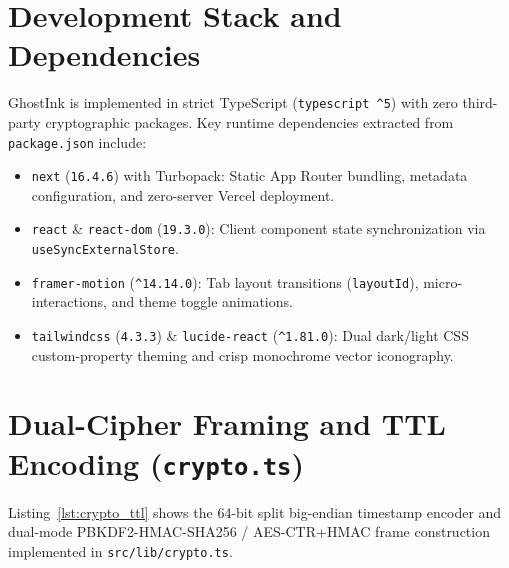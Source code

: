 \documentclass[12pt,a4paper,oneside,openany]{report}
\begin{document}
\section{Development Stack and Dependencies}
GhostInk is implemented in strict TypeScript (\texttt{typescript \^{}5}) with zero third-party cryptographic packages. Key runtime dependencies extracted from \texttt{package.json} include:
\begin{itemize}
    \item \texttt{next} (\texttt{16.4.6}) with Turbopack: Static App Router bundling, metadata configuration, and zero-server Vercel deployment.
    \item \texttt{react} \& \texttt{react-dom} (\texttt{19.3.0}): Client component state synchronization via \texttt{useSyncExternalStore}.
    \item \texttt{framer-motion} (\texttt{\^{}14.14.0}): Tab layout transitions (\texttt{layoutId}), micro-interactions, and theme toggle animations.
    \item \texttt{tailwindcss} (\texttt{4.3.3}) \& \texttt{lucide-react} (\texttt{\^{}1.81.0}): Dual dark/light CSS custom-property theming and crisp monochrome vector iconography.
\end{itemize}

\section{Dual-Cipher Framing and TTL Encoding (\texttt{crypto.ts})}
Listing~\ref{lst:crypto_ttl} shows the 64-bit split big-endian timestamp encoder and dual-mode PBKDF2-HMAC-SHA256 / AES-CTR+HMAC frame construction implemented in \texttt{src/lib/crypto.ts}.
\end{document}
